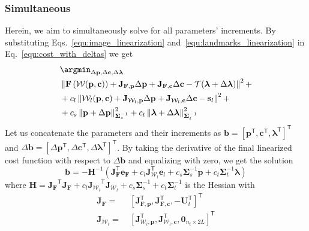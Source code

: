 \subsubsection{Simultaneous}
Herein, we aim to simultaneously solve for all parameters' increments.
By substituting Eqs.~\ref{equ:image_linearization} and~\ref{equ:landmarks_linearization}
in Eq.~\ref{equ:cost_with_deltas} we get
%
\begin{equation}
\begin{aligned}
&\argmin_{\Delta\mathbf{p},\Delta\mathbf{c},\Delta\boldsymbol{\lambda}}\\
&\left\lVert\mathbf{F}\left(\mathcal{W}(\mathbf{p},\mathbf{c})\right) + \mathbf{J}_{\mathbf{F},\mathbf{p}}\Delta\mathbf{p} + \mathbf{J}_{\mathbf{F},\mathbf{c}}\Delta\mathbf{c} - \mathcal{T}(\boldsymbol{\lambda}+\Delta\boldsymbol{\lambda})\right\rVert^2 + \\
&+ c_l\left\lVert\mathcal{W}_l(\mathbf{p},\mathbf{c}) + \mathbf{J}_{\mathcal{W}_l,\mathbf{p}}\Delta\mathbf{p} + \mathbf{J}_{\mathcal{W}_l,\mathbf{c}}\Delta\mathbf{c} - \mathbf{s}_l\right\rVert^2 +\\
&+ c_s\left\lVert\mathbf{p}+\Delta\mathbf{p}\right\rVert^2_{\mathbf{\Sigma}_s^{-1}} + c_t\left\lVert\boldsymbol{\lambda}+\Delta\boldsymbol{\lambda}\right\rVert^2_{\mathbf{\Sigma}_t^{-1}}
\end{aligned}
\label{equ:simultaneous_cost}
\end{equation}
%
Let us concatenate the parameters and their increments as
$\mathbf{b}={[\mathbf{p}^\mathsf{T}, \mathbf{c}^\mathsf{T}, \boldsymbol{\lambda}^\mathsf{T}]}^\mathsf{T}$
and
$\Delta\mathbf{b}={[\Delta\mathbf{p}^\mathsf{T}, \Delta\mathbf{c}^\mathsf{T}, \Delta\boldsymbol{\lambda}^\mathsf{T}]}^\mathsf{T}$.
By taking the derivative of the final linearized cost function with respect to
$\Delta\mathbf{b}$ and equalizing with zero, we get the solution
%
\begin{equation}
\mathbf{b} = -\mathbf{H}^{-1} \left(\mathbf{J}_{\mathbf{F}}^\mathsf{T}\mathbf{e}_{\mathbf{F}} + c_l\mathbf{J}_{\mathcal{W}_l}^\mathsf{T}\mathbf{e}_l + c_s\mathbf{\Sigma}_s^{-1}\mathbf{p} + c_t\mathbf{\Sigma}_t^{-1}\boldsymbol{\lambda}\right)
\end{equation}
%
where
$\mathbf{H}={\mathbf{J}_{\mathbf{F}}}^\mathsf{T}\mathbf{J}_{\mathbf{F}} + c_l{\mathbf{J}_{\mathcal{W}_l}}^\mathsf{T}\mathbf{J}_{\mathcal{W}_l} + c_s\mathbf{\Sigma}_s^{-1} + c_t\mathbf{\Sigma}_t^{-1}$
is the Hessian with
%
\begin{equation}
\begin{aligned}
\mathbf{J}_{\mathbf{F}} = &~{\left[\mathbf{J}_{\mathbf{F},\mathbf{p}}^\mathsf{T}, \mathbf{J}_{\mathbf{F},\mathbf{c}}^\mathsf{T}, -\mathbf{U}_t^\mathsf{T}\right]}^\mathsf{T}\\
\mathbf{J}_{\mathcal{W}_l} = &~{\left[\mathbf{J}_{\mathcal{W}_l,\mathbf{p}}^\mathsf{T}, \mathbf{J}_{\mathcal{W}_l,\mathbf{c}}^\mathsf{T}, \mathbf{0}_{n_t\times 2L}\right]}^\mathsf{T}
\end{aligned}
\end{equation}
